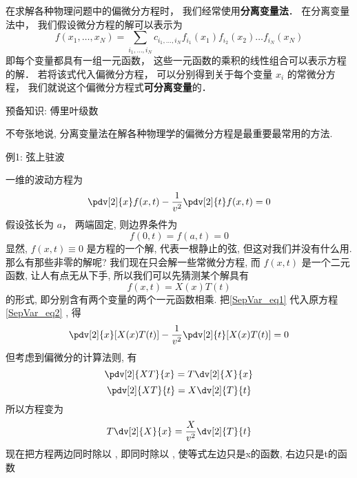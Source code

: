 
\begin{issues}
\issueDraft
\end{issues}


在求解各种物理问题中的偏微分方程时， 我们经常使用\textbf{分离变量法}． 在分离变量法中， 我们假设微分方程的解可以表示为
\begin{equation}\label{SepVar_eq2}
f(x_1, \dots , x_N) = \sum_{i_1, \dots, i_N} c_{i_1, \dots, i_N} f_{i_1}(x_1) f_{i_2}(x_2) \dots f_{i_N}(x_N)
\end{equation}
即每个变量都具有一组一元函数， 这些一元函数的乘积的线性组合可以表示方程的解． 若将该式代入偏微分方程， 可以分别得到关于每个变量 $x_i$ 的常微分方程， 我们就说这个偏微分方程式\textbf{可分离变量}的．


预备知识: 傅里叶级数

不夸张地说, 分离变量法在解各种物理学的偏微分方程是最重要最常用的方法.

例1: 弦上驻波

一维的波动方程为
\begin{equation}
\pdv[2]{x} f(x, t) - \frac{1}{v^2} \pdv[2]{t}f(x, t) = 0
\end{equation}
假设弦长为 $a$， 两端固定, 则边界条件为
\begin{equation}
f(0, t) = f(a, t) = 0
\end{equation}
显然, $f(x, t) \equiv 0$ 是方程的一个解, 代表一根静止的弦, 但这对我们并没有什么用. 那么有那些非零的解呢? 我们现在只会解一些常微分方程, 而 $f(x, t)$ 是一个二元函数, 让人有点无从下手, 所以我们可以先猜测某个解具有
\begin{equation}\label{SepVar_eq1}
f(x, t) = X(x) T(t)
\end{equation}
的形式, 即分别含有两个变量的两个一元函数相乘. 把\autoref{SepVar_eq1} 代入原方程\autoref{SepVar_eq2} , 得
\begin{equation}
\pdv[2]{x}[X(x)T(t)] - \frac{1}{v^2}\pdv[2]{t} [X(x) T(t)] = 0
\end{equation}
但考虑到偏微分的计算法则, 有
\begin{equation}
\pdv[2]{XT}{x} = T \dv[2]{X}{x}
\end{equation}
\begin{equation}
\pdv[2]{XT}{t} = X \dv[2]{T}{t}
\end{equation}
所以方程变为
\begin{equation}
T\dv[2]{X}{x} = \frac{X}{v^2} \dv[2]{T}{t}
\end{equation}
现在把方程两边同时除以 , 即同时除以 , 使等式左边只是x的函数, 右边只是t的函数
